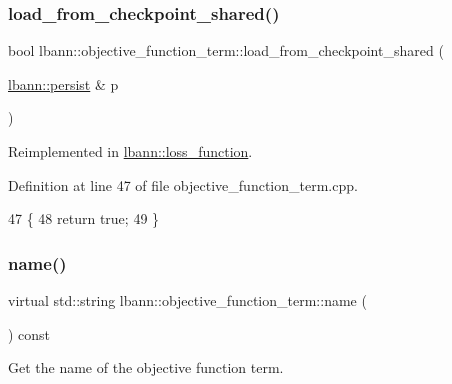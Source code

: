 \subsubsection{\texorpdfstring{load\+\_\+from\+\_\+checkpoint\+\_\+shared()}{load\_from\_checkpoint\_shared()}}
{\footnotesize\ttfamily bool lbann\+::objective\+\_\+function\+\_\+term\+::load\+\_\+from\+\_\+checkpoint\+\_\+shared (\begin{DoxyParamCaption}\item[{\hyperlink{classlbann_1_1persist}{lbann\+::persist} \&}]{p }\end{DoxyParamCaption})\hspace{0.3cm}{\ttfamily [virtual]}}



Reimplemented in \hyperlink{classlbann_1_1loss__function_ae948babd62a110e2407271f24dcaec1b}{lbann\+::loss\+\_\+function}.



Definition at line 47 of file objective\+\_\+function\+\_\+term.\+cpp.


\begin{DoxyCode}
47                                                                          \{
48   \textcolor{keywordflow}{return} \textcolor{keyword}{true};
49 \}
\end{DoxyCode}
\mbox{\label{classlbann_1_1objective__function__term_a964fbfad3dd0434aa8f32c5fedf1079a}} 
\subsubsection{\texorpdfstring{name()}{name()}}
{\footnotesize\ttfamily virtual std\+::string lbann\+::objective\+\_\+function\+\_\+term\+::name (\begin{DoxyParamCaption}{ }\end{DoxyParamCaption}) const\hspace{0.3cm}{\ttfamily [pure virtual]}}

Get the name of the objective function term. 

